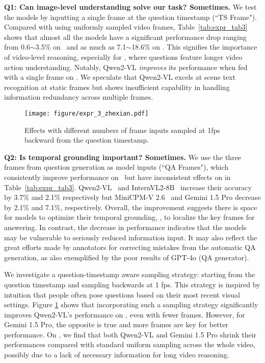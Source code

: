 {\noindent\textbf{Q1: Can image-level understanding solve our task?  Sometimes.}
We test the models by inputting a single frame at the question timestamp (``TS Frame"). Compared with using uniformly sampled video frames, Table~\ref{tab:expr_tab3} shows that almost all the models have a significant performance drop ranging from 0.6$\sim$3.5\% on \datasetout ~and as much as 7.1$\sim$18.6\% on \datasetin. This signifies the importance of video-level reasoning, especially for \datasetin, where questions feature longer video action understanding. Notably, Qwen2-VL \emph{improves} its performance when fed with a single frame on \datasetout. We speculate that 
Qwen2-VL excels at scene text recognition at static frames but shows insufficient capability in handling information redundancy across multiple frames.
\begin{figure}[t!]
\centering
\texttt{[image: figure/expr\_3\_zhexian.pdf]}
\vspace{-0.2in}
\caption{Effects with different numbers of frame inputs sampled at 1fps backward from the question timestamp.} 
\label{fig:expr_3_zhexian}
\vspace{-0.6cm}
\end{figure}

\noindent\textbf{Q2: Is temporal grounding important? Sometimes.}
We use the three frames from question generation as model inputs (``QA Frames"), which consistently improve performance on \datasetin~but have inconsistent effects on \datasetout in Table~\ref{tab:expr_tab3}.
Qwen2-VL~\cite{wang2024qwen2} and InternVL2-8B~\cite{chen2024far} increase their accuracy by 3.7\% and 2.1\% respectively but MiniCPM-V 2.6~\cite{yao2024minicpm} and Gemini 1.5 Pro decrease by 2.1\% and 7.1\%, respectively. Overall, the improvement suggests there is space for models to optimize their temporal grounding, \ie, to localize the key frames for answering.
In contrast, the decrease in performance indicates that the models may be vulnerable to seriously reduced information input. It may also reflect the great efforts made by annotators for correcting mistakes from the automatic QA generation, as also exemplified by the poor results of GPT-4o (QA generator).


We investigate a question-timestamp aware sampling strategy: starting from the question timestamp and sampling backwards at 1 fps. This strategy is inspired by intuition that people often pose questions based on their most recent visual settings. Figure \ref{fig:expr_3_zhexian} shows that incorporating such a sampling strategy significantly improves Qwen2-VL's performance on \datasetout, even with fewer frames. However, for Gemini 1.5 Pro, the opposite is true and more frames are key for better performance. On \datasetin, we find that both Qwen2-VL and Gemini 1.5 Pro shrink their performances compared with standard uniform sampling across the whole video, possibly due to a lack of necessary information for long video reasoning.




}
